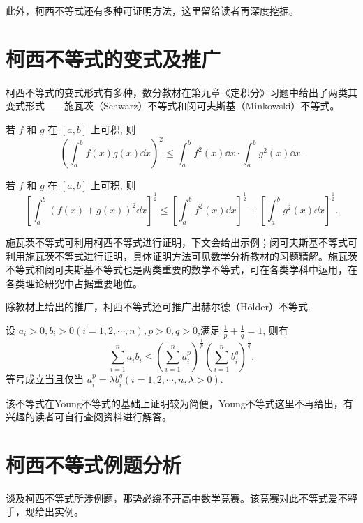 此外，柯西不等式还有多种可证明方法，这里留给读者再深度挖掘。



\section{柯西不等式的变式及推广}

柯西不等式的变式形式有多种，数分教材在第九章《定积分》习题中给出了两类其变式形式——施瓦茨（Schwarz）不等式和闵可夫斯基（Minkowski）不等式。

\begin{theorem}\label{thm:shwarzinequality}
  若 $f$ 和 $g$ 在 $[a, b]$ 上可积, 则 \[\left(\int_{a}^{b} f(x) g(x) \dd{x}\right)^{2} \leq \int_{a}^{b} f^{2}(x) \dd{x} \cdot \int_{a}^{b} g^{2}(x) \dd{x}.\]
\end{theorem}


\begin{theorem}
  若 $f$ 和 $g$ 在 $[a, b]$ 上可积, 则 \[\left[\int_{a}^{b}(f(x)+g(x))^{2} \dd{x}\right]^{\frac{1}{2}} \leq\left[\int_{a}^{b} f^{2}(x) \dd{x}\right]^{\frac{1}{2}}+\left[\int_{a}^{b} g^{2}(x) \dd{x}\right]^{\frac{1}{2}}.\]
\end{theorem}


施瓦茨不等式可利用柯西不等式进行证明，下文会给出示例；闵可夫斯基不等式可利用施瓦茨不等式进行证明，具体证明方法可见数学分析教材的习题精解。施瓦茨不等式和闵可夫斯基不等式也是两类重要的数学不等式，可在各类学科中运用，在各类理论研究中占据重要地位。

除教材上给出的推广，柯西不等式还可推广出赫尔德（Hölder）不等式.


\begin{theorem}
  设 $a_{i}>0, b_{i}>0(i=1,2, \cdots, n), p>0, q>0$,满足 $\frac{1}{p}+\frac{1}{q}=1$, 则有 \[\sum_{i=1}^{n} a_{i} b_{i} \leq\left(\sum_{i=1}^{n} a_{i}^{p}\right)^{\frac{1}{p}}\left(\sum_{i=1}^{n} b_{i}^{q}\right)^{\frac{1}{q}}.\] 等号成立当且仅当 $a_{i}^{p}=\lambda b_{i}^{q}(i=1,2, \cdots, n, \lambda>0)$.
\end{theorem}

该不等式在Young不等式的基础上证明较为简便，Young不等式这里不再给出，有兴趣的读者可自行查阅资料进行解答。


\section{柯西不等式例题分析}

谈及柯西不等式所涉例题，那势必绕不开高中数学竞赛。该竞赛对此不等式爱不释手，现给出实例。

